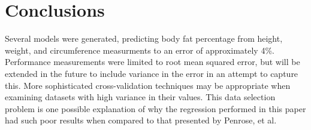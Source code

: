 \documentclass{IEEEtran}
\begin{document}
\section{Conclusions}

Several models were generated, predicting body fat percentage from height, weight, and circumference measurments to an error of approximately 4\%. Performance measurements were limited to root mean squared error, but will be extended in the future to include variance in the error in an attempt to capture this. More sophisticated cross-validation techniques may be appropriate when examining datasets with high variance in their values. This data selection problem is one possible explanation of why the regression performed in this paper had such poor results when compared to that presented by Penrose, et al.

\printbibliography

%
\end{document}
